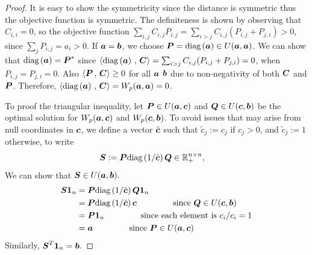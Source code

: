 \documentclass[11pt]{article}
\begin{document}
\begin{proof}
It is easy to show the symmetricity since the distance is symmetric thus the objective function is symmetric. The definiteness is shown by observing that $C_{i,i} = 0$, so the objective function $\sum_{i,j}C_{i,j}P_{i,j} = \sum_{i > j}C_{i,j}(P_{i,j} + P_{j,i}) > 0$, since $\sum_{j}P_{i,j} = a_{i} > 0$. If $\boldsymbol{a} = \boldsymbol{b}$, we choose $\boldsymbol{P} = \text{diag}\left(\boldsymbol{a}\right) \in U(\boldsymbol{a}, \boldsymbol{a})$. We can show that $\text{diag}\left(\boldsymbol{a}\right)  = \boldsymbol{P}^{*}$ since $\left\langle \text{diag}\left(\boldsymbol{a}\right)\,,\, \boldsymbol{C} \right\rangle  = \sum_{i > j}C_{i,j}(P_{i,j} + P_{j,i})  = 0$, when $P_{i,j} = P_{j,i} = 0$. Also $\left\langle \boldsymbol{P}\,,\, \boldsymbol{C} \right\rangle \ge 0$ for all $\boldsymbol{a}$ $\boldsymbol{b}$ due to non-negativity of both $\boldsymbol{C}$ and $\boldsymbol{P}$. Therefore, $\left\langle \text{diag}\left(\boldsymbol{a}\right)\,,\, \boldsymbol{C} \right\rangle = W_{p}(\boldsymbol{a}, \boldsymbol{a}) = 0$.

To proof the triangular inequality, let $\boldsymbol{P} \in U(\boldsymbol{a}, \boldsymbol{c})$ and $\boldsymbol{Q} \in U(\boldsymbol{c}, \boldsymbol{b})$ be the optimal solution for $W_{p}(\boldsymbol{a}, \boldsymbol{c})$ and $W_{p}(\boldsymbol{c}, \boldsymbol{b})$. To avoid issues
that may arise from null coordinates in $\boldsymbol{c}$, we define a vector $\tilde{\boldsymbol{c}}$ such that $\tilde{c}_j := c_j$ if $c_j > 0$, and $\tilde{c}_j := 1$ otherwise, to write
\begin{align*}
\boldsymbol{S} &:= \boldsymbol{P}\text{diag}\left(1/\tilde{\boldsymbol{c}}\right)\boldsymbol{Q} \in {\mathbb R}_{+}^{n\times n},
\end{align*} We can show that $\boldsymbol{S} \in U(\boldsymbol{a}, \boldsymbol{b}).$
\begin{align*}
\boldsymbol{S}\boldsymbol{1}_{n} &=  \boldsymbol{P}\text{diag}\left(1/\tilde{\boldsymbol{c}}\right)\boldsymbol{Q}\boldsymbol{1}_{n} \\
&=  \boldsymbol{P}\text{diag}\left(1/\tilde{\boldsymbol{c}}\right)\boldsymbol{c} \qquad\qquad \text{ since } \boldsymbol{Q} \in U(\boldsymbol{c}, \boldsymbol{b})\\
&=  \boldsymbol{P}\boldsymbol{1}_{n}\qquad\qquad\text{ since each element is } c_{i}/c_{i} = 1\\ 
&= \boldsymbol{a}\qquad\qquad\text{ since } \boldsymbol{P} \in U(\boldsymbol{a}, \boldsymbol{c})
\end{align*} Similarly, $\boldsymbol{S}^{T}\boldsymbol{1}_{n} =\boldsymbol{b}$. 


\end{proof}
\end{document}
